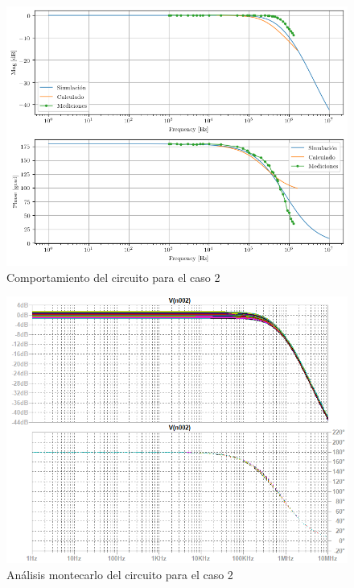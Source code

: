 \begin{figure}[H]
\begin{centering}
\includegraphics[scale=0.5]{../Ex1/iA/Resources1a/H2}
\par\end{centering}
\caption{Comportamiento del circuito para el caso 2}
\label{1_a_2_b}
\end{figure}

\begin{figure}[H]
\begin{centering}
\includegraphics[scale=0.5]{../Ex1/iA/Resources1a/montecarlo1a_2}
\par\end{centering}
\caption{Análisis montecarlo del circuito para el caso 2}

\end{figure}

